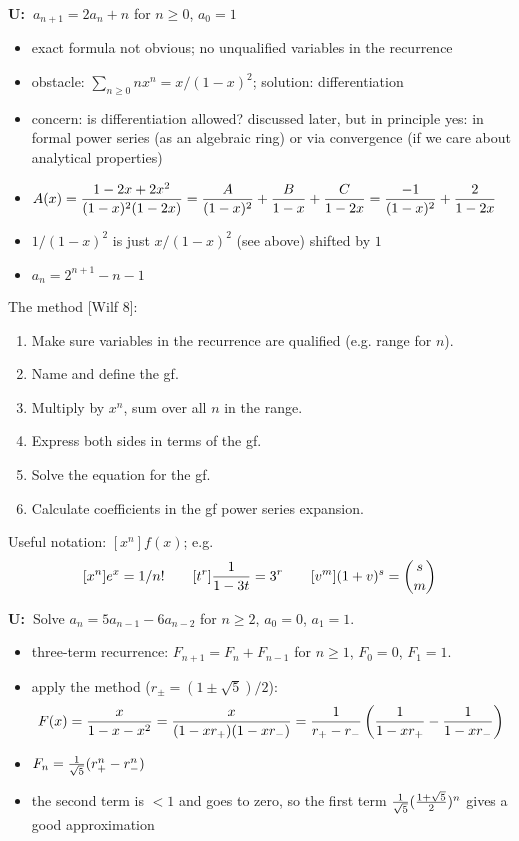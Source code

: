 \documentclass[10pt, a4paper]{article}
\newcommand*\ruleline[1]{\par\noindent\raisebox{.8ex}{\makebox[\linewidth]{\hrulefill\hspace{1ex}\raisebox{-.8ex}{#1}\hspace{1ex}\hrulefill}}}
\def\U{{\bf U:\ }}
\def\ans#1{\big[\hskip 2mm {#1}\hskip 2mm\big]}
\begin{document}
\U $a_{n+1}=2a_n+n$ for $n\ge 0$, $a_0=1$
\begin{itemize}[label=--]
    \item exact formula not obvious; no unqualified variables in the recurrence
    \item obstacle: $\sum_{n\ge 0} nx^n = x/(1-x)^2$; solution: differentiation
    \item concern: is differentiation allowed? discussed later, but in principle yes:
        in formal power series (as an algebraic ring) or via convergence (if we care about analytical properties)
    \item $\displaystyle A(x) = {1-2x+2x^2\over (1-x)^2(1-2x)} = {A\over (1-x)^2} + {B\over 1-x} + {C\over 1-2x} = {-1\over (1-x)^2} + {2\over 1-2x}$
    \item $1/(1-x)^2$ is just $x/(1-x)^2$ (see above) shifted by $1$
    \item $a_n=2^{n+1}-n-1$
\end{itemize}

The method [Wilf 8]:
\begin{enumerate}
    \item Make sure variables in the recurrence are qualified (e.g. range for $n$).
    \item Name and define the gf.
    \item Multiply by $x^n$, sum over all $n$ in the range.
    \item Express both sides in terms of the gf.
    \item Solve the equation for the gf.
    \item Calculate coefficients in the gf power series expansion.
\end{enumerate}

Useful notation: $[x^n]f(x)$; e.g.
$$
    [x^n]e^x=1/n!\qquad [t^r]{1\over 1-3t}=3^r\qquad [v^m](1+v)^s={s\choose m}
$$

\U Solve $a_n=5a_{n-1}-6a_{n-2}$ for $n\ge 2$, $a_0 = 0$, $a_1=1$. \ans{$G(x) = {x\over (1-2x)(1-3x)}$; $a_n = 3^n-2^n$}

\ruleline{The Fibonacci sequence [Wilf 8--10]}

\begin{itemize}
    \item three-term recurrence: $F_{n+1}=F_n+F_{n-1}$ for $n\ge 1$, $F_0=0$, $F_1=1$.
    \item apply the method ($r_\pm = (1\pm \sqrt 5)/2$): $$\displaystyle F(x) = {x\over 1-x-x^2} = {x\over (1-xr_{+})(1-xr_{-})}={1\over r_{+}-r_{-}}\left({1\over 1-xr_{+}}-{1\over 1-xr_{-}}\right)$$
    \item $F_n={1\over \sqrt 5}(r_{+}^n-r_{-}^n)$
    \item the second term is ${} < 1$ and goes to zero, so the first term ${1\over \sqrt 5}({1+\sqrt 5\over 2})^n$ gives a good approximation
\end{itemize}
\end{document}

